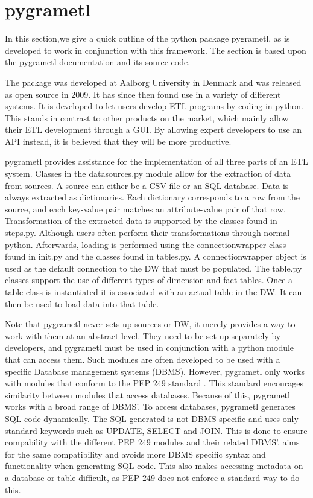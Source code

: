 \section{pygrametl}\label{sect:pygrametl}
In this section,we give a quick outline of the python package pygrametl, as \FW{} is developed to work in conjunction with this framework. The section is based upon the pygrametl documentation and its source code\cite{pygramSource}.

The package was developed at Aalborg University in Denmark and was released as open source in 2009. It has since then found use in a variety of different systems. It is developed to let users develop ETL programs by coding in python. This stands in contrast to other products on the market, which mainly allow their ETL development through a GUI. By allowing expert developers to use an API instead, it is believed that they will be more productive.

pygrametl provides assistance for the implementation of all three parts of an ETL system. Classes in the datasources.py module allow for the extraction of data from sources. A source can either be a CSV file or an SQL database. Data is always extracted as dictionaries. Each dictionary corresponds to a row from the source, and each key-value pair matches an attribute-value pair of that row. Transformation of the extracted data is supported by the classes found in steps.py. Although users often perform their transformations through normal python. Afterwards, loading is performed using the connectionwrapper class found in init.py and the classes found in tables.py. A connectionwrapper object is used as the default connection to the DW that must be populated. The table.py classes support the use of different types of dimension and fact tables. Once a table class is instantiated it is associated with an actual table in the DW. It can then be used to load data into that table.

Note that pygrametl never sets up sources or DW, it merely provides a way to work with them at an abstract level. They need to be set up separately by developers, and pygrametl must be used in conjunction with a python module that can access them. Such modules are often developed to be used with a specific Database management systems (DBMS). However, pygrametl only works with modules that conform to the PEP 249 standard \cite{pep249}. This standard encourages similarity between modules that access databases. Because of this, pygrametl works with a broad range of DBMS’. To access databases, pygrametl generates SQL code dynamically. The SQL generated is not DBMS specific and uses only standard keywords such as UPDATE, SELECT and JOIN. This is done to ensure compability with the different PEP 249 modules and their related DBMS’. \FW{} aims for the same compatibility and avoids more DBMS specific syntax and functionality when generating SQL code. This also makes accessing metadata on a database or table difficult, as PEP 249 does not enforce a standard way to do this.
